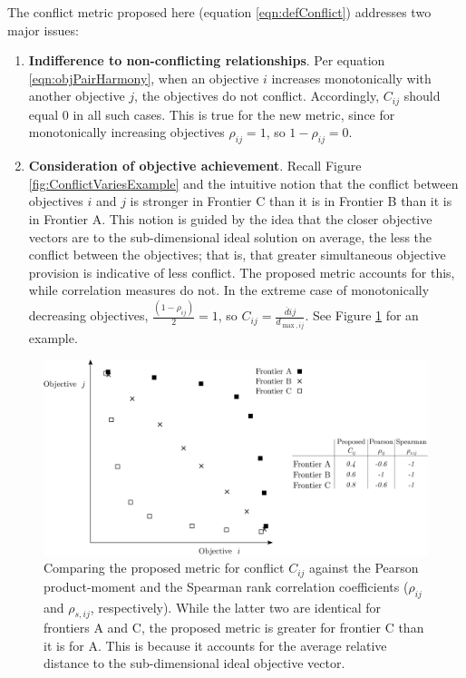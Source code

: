 The conflict metric proposed here (equation \eqref{eqn:defConflict}) addresses two major issues:
\begin{enumerate}
\item \textbf{Indifference to non-conflicting relationships}. Per equation \eqref{eqn:objPairHarmony}, when an objective $i$ increases monotonically with another objective $j$, the objectives do not conflict. Accordingly, $C_{ij}$ should equal 0 in all such cases. This is true for the new metric, since for monotonically increasing objectives $\rho_{ij} = 1$, so $1-\rho_{ij} = 0$.
\item \textbf{Consideration of objective achievement}. Recall Figure \ref{fig:ConflictVariesExample} and the intuitive notion that the conflict between objectives $i$ and $j$ is stronger in Frontier C than it is in Frontier B than it is in Frontier A. This notion is guided by the idea that the closer objective vectors are to the sub-dimensional ideal solution on average, the less the conflict between the objectives; that is, that greater simultaneous objective provision is indicative of less conflict. The proposed metric accounts for this, while correlation measures do not. In the extreme case of monotonically decreasing objectives, $\frac{(1-\rho_{ij})}{2} = 1$, so $C_{ij} = \frac{\overbar{d}{ij}}{d_{\max,ij}}$. See Figure \ref{fig:WhyOursIsBetter} for an example.
\end{enumerate}
\begin{figure}[ht]
\centering
\includegraphics[width=.9\textwidth]{../images/WhyOursIsBetter}
\caption[Comparing the proposed conflict metric to others used in multi-objective optimization]{Comparing the proposed metric for conflict $C_{ij}$ against the Pearson product-moment and the Spearman rank correlation coefficients ($\rho_{ij}$ and $\rho_{s,ij}$, respectively). While the latter two are identical for frontiers A and C, the proposed metric is greater for frontier C than it is for A. This is because it accounts for the average relative distance to the sub-dimensional ideal objective vector.}
\label{fig:WhyOursIsBetter}
\end{figure}

